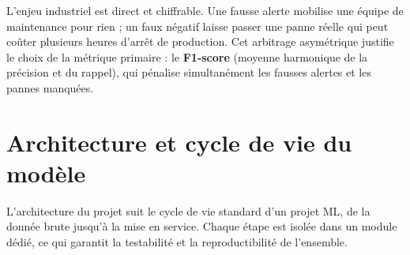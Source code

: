 \documentclass[11pt]{article}
\begin{document}
L'enjeu industriel est direct et chiffrable. Une fausse alerte mobilise une équipe
de maintenance pour rien ; un faux négatif laisse passer une panne réelle qui peut
coûter plusieurs heures d'arrêt de production. Cet arbitrage asymétrique justifie
le choix de la métrique primaire : le \textbf{F1-score} (moyenne harmonique de la
précision et du rappel), qui pénalise simultanément les fausses alertes et les
pannes manquées.

\section{Architecture et cycle de vie du modèle}

L'architecture du projet suit le cycle de vie standard d'un projet ML, de la donnée
brute jusqu'à la mise en service. Chaque étape est isolée dans un module dédié, ce
qui garantit la testabilité et la reproductibilité de l'ensemble.
\end{document}
